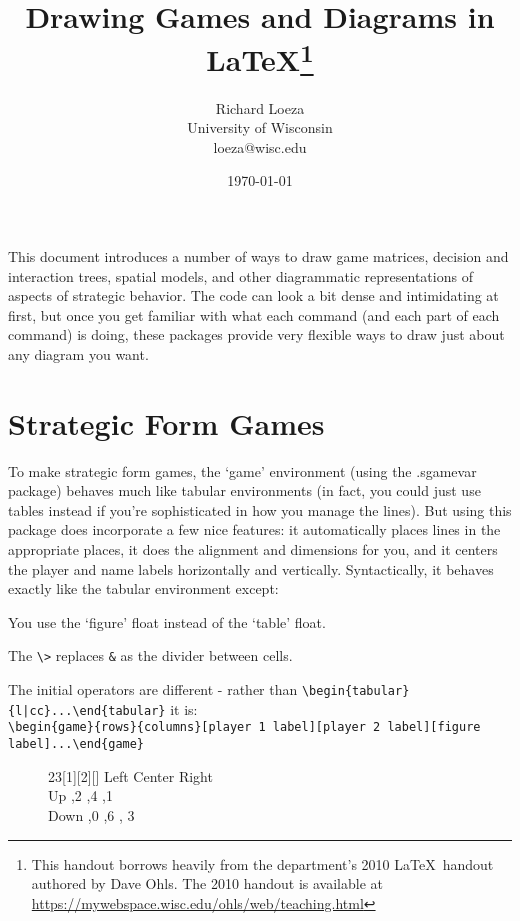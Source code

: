 \documentclass[10.5pt]{article}
\title{Drawing Games and Diagrams in \LaTeX\thanks{This handout borrows heavily from the department's 2010 \LaTeX~handout authored by Dave Ohls. The 2010 handout is available at \url{https://mywebspace.wisc.edu/ohls/web/teaching.html}}}
\author{Richard Loeza\\ University of Wisconsin \\ loeza@wisc.edu}
\date{\today}
\begin{document}
\maketitle

This document introduces a number of ways to draw game matrices, decision and interaction trees, spatial models, and other diagrammatic representations of aspects of strategic behavior.  The code can look a bit dense and intimidating at first, but once you get familiar with what each command (and each part of each command) is doing, these packages provide very flexible ways to draw just about any diagram you want.   \\





\section{Strategic Form Games}

To make strategic form games, the `game' environment (using the .sgamevar package) behaves much like tabular environments (in fact, you could just use tables instead if you're sophisticated in how you manage the lines).  But using this package does incorporate a few nice features: it automatically places lines in the appropriate places, it does the alignment and dimensions for you, and it centers the player and name labels horizontally and vertically.  Syntactically, it behaves exactly like the tabular environment except:\\

\begin{compactitem}
\item You use the `figure' float instead of the `table' float.
\item The \verb+\>+ replaces \verb+&+ as the divider between cells. %
\item The initial operators are different - rather than \verb+\begin{tabular}{l|cc}...\end{tabular}+ it is: \\ \verb+\begin{game}{rows}{columns}[player 1 label][player 2 label][figure label]...\end{game}+ \\
\end{compactitem}

\begin{figure}[h!]
\begin{center}
\begin{footnotesize}
\begin{game}{2}{3}[1][2][]
        \> Left \> Center \> Right   \\
Up      ,2  ,4    ,1   \\
Down    ,0  ,6    , 3 \\
\end{game}
\end{footnotesize}
\end{center}
\end{figure}
\end{document}

